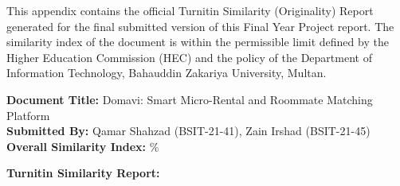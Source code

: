
This appendix contains the official Turnitin Similarity (Originality) Report generated for the final submitted version of this Final Year Project report. The similarity index of the document is within the permissible limit defined by the Higher Education Commission (HEC) and the policy of the Department of Information Technology, Bahauddin Zakariya University, Multan.

\vspace{0.4cm}

\noindent
\textbf{Document Title:} Domavi: Smart Micro-Rental and Roommate Matching Platform \\
\textbf{Submitted By:} Qamar Shahzad (BSIT-21-41), Zain Irshad (BSIT-21-45) \\
\textbf{Overall Similarity Index:} \underline{\hspace{2.5cm}} \%

\vspace{0.6cm}

\noindent
\textbf{Turnitin Similarity Report:}

\vspace{0.4cm}


\begin{center}
\end{center}

